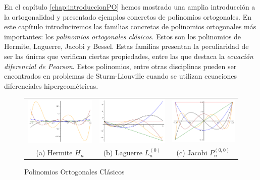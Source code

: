 


En el capítulo \ref{chap:introduccionPO} hemos mostrado una amplia introducción a la ortogonalidad y presentado ejemplos concretos de polinomios ortogonales. En este capítulo introduciremos las familias concretas de polinomios ortogonales más importantes: los \textit{polinomios ortogonales clásicos}. Estos son los polinomios de Hermite, Laguerre, Jacobi y Bessel. Estas familias presentan la peculiaridad de ser las únicas que verifican ciertas propiedades, entre las que destaca la \textit{ecuación diferencial de Pearson}. Estos polinomios, entre otras disciplinas pueden ser encontrados en problemas de Sturm-Liouville cuando se utilizan ecuaciones diferenciales hipergeométricas.

\begin{figure}[h]
    \centering
    \begin{tabular}{ccc}
        \includegraphics[width=5cm]{img/C2/hermite.png} & 
        \includegraphics[width=5cm]{img/C2/laguerre.png} &
        \includegraphics[width=5cm]{img/C2/jacobi.png} \\
        (a) Hermite $H_n$ & (b) Laguerre $L^{(0)}_n$ & (c) Jacobi $P^{(0,0)}_n$ 
    \end{tabular}
    \caption{Polinomios Ortogonales Clásicos}
    \label{img:graficas-clasicos}
\end{figure}


